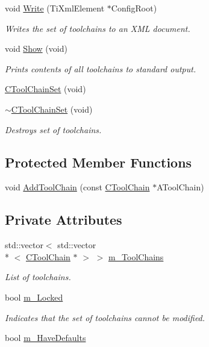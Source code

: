 \begin{DoxyCompactItemize}
void \hyperlink{classCToolChainSet_a461855b2af110de7ef0f74514c015689}{Write} (Ti\-Xml\-Element $\ast$Config\-Root)
\begin{DoxyCompactList}\small\item\em Writes the set of toolchains to an X\-M\-L document. \end{DoxyCompactList}\item 
void \hyperlink{classCToolChainSet_ad33e134b40b8a92af770f802aa5b596c}{Show} (void)
\begin{DoxyCompactList}\small\item\em Prints contents of all toolchains to standard output. \end{DoxyCompactList}\item 
\hyperlink{classCToolChainSet_ad767d2d75ddd9b06a13ba28946493c2a}{C\-Tool\-Chain\-Set} (void)
\item 
\hyperlink{classCToolChainSet_a5326442eb8b8938aee24500f4acb7c92}{$\sim$\-C\-Tool\-Chain\-Set} (void)
\begin{DoxyCompactList}\small\item\em Destroys set of toolchains. \end{DoxyCompactList}\end{DoxyCompactItemize}
\subsection*{Protected Member Functions}
\begin{DoxyCompactItemize}
\item 
void \hyperlink{classCToolChainSet_a723b7c2077dda03dd6e6e5419c054f6d}{Add\-Tool\-Chain} (const \hyperlink{classCToolChain}{C\-Tool\-Chain} $\ast$A\-Tool\-Chain)
\end{DoxyCompactItemize}
\subsection*{Private Attributes}
\begin{DoxyCompactItemize}
\item 
std\-::vector$<$ std\-::vector\\*
$<$ \hyperlink{classCToolChain}{C\-Tool\-Chain} $\ast$ $>$ $>$ \hyperlink{classCToolChainSet_afb74ad132fb56b1fb9e4cc3baf11283a}{m\-\_\-\-Tool\-Chains}
\begin{DoxyCompactList}\small\item\em List of toolchains. \end{DoxyCompactList}\item 
bool \hyperlink{classCToolChainSet_ad1825a1171045260dfdcf6ce7195680a}{m\-\_\-\-Locked}
\begin{DoxyCompactList}\small\item\em Indicates that the set of toolchains cannot be modified. \end{DoxyCompactList}\item 
bool \hyperlink{classCToolChainSet_aff78567e6f6acc76f0ef60b7afdd5ea8}{m\-\_\-\-Have\-Defaults}
\end{DoxyCompactItemize}



